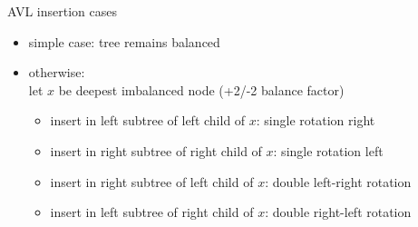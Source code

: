\begin{frame}[label=avlInsCases]{AVL insertion cases}
\begin{itemize}
    \item simple case: tree remains balanced
    \item otherwise: \\ let $x$ be deepest imbalanced node (+2/-2 balance factor)
    \begin{itemize}
    \item insert in left subtree of left child of $x$: single rotation right
    \item insert in right subtree of right child of $x$: single rotation left
    \item insert in right subtree of left child of $x$: double left-right rotation
    \item insert in left subtree of right child of $x$: double right-left rotation
    \end{itemize}
\end{itemize}
\end{frame}
